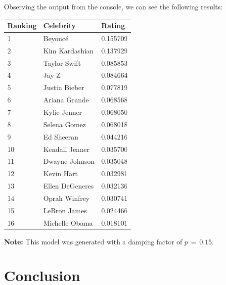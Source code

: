 \documentclass[11pt]{article}
\begin{document}
      Observing the output from the console, we can see the following results:
      \label{pagerank-results}
      \begin{table}[H]
        \centering
        \begin{tabular}{|l|l|l|}
          \hline
          \rowcolor[HTML]{C0C0C0} 
          Ranking & Celebrity & Rating\\ \hline
          1 & Beyoncé &  0.155709 \\ \hline
          2 & Kim Kardashian &  0.137929 \\ \hline
          3 & Taylor Swift &  0.085853 \\ \hline
          4 & Jay-Z &  0.084664 \\ \hline
          5 & Justin Bieber &  0.077819 \\ \hline
          6 & Ariana Grande &  0.068568 \\ \hline
          7 & Kylie Jenner &  0.068050 \\ \hline
          8 & Selena Gomez &  0.068018 \\ \hline
          9 & Ed Sheeran &  0.044216 \\ \hline
          10 & Kendall Jenner &  0.035700 \\ \hline
          11 & Dwayne Johnson &  0.035048 \\ \hline
          12 & Kevin Hart &  0.032981 \\ \hline
          13 & Ellen DeGeneres &  0.032136 \\ \hline
          14 & Oprah Winfrey &  0.030741 \\ \hline
          15 & LeBron James &  0.024466 \\ \hline
          16 & Michelle Obama &  0.018101 \\ \hline
        \end{tabular}
      \end{table}
      \textbf{Note:} This model was generated with a damping factor of $p \, = \, 0.15$.
    
    \section{Conclusion}
\end{document}
